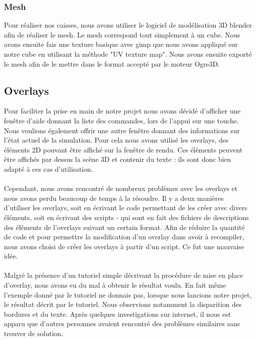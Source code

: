 \subsubsection{Mesh}
Pour réaliser nos caisses, nous avons utiliser le logiciel de modélisation 3D
blender afin de réaliser le mesh. Le mesh correspond tout simplement à un
cube. Nous avons ensuite fais une texture basique avec gimp que nous avons
appliqué sur notre cube en utilisant la méthode "UV texture map".
Nous avons ensuite exporté le mesh afin de le mettre dans le format
accepté par le moteur Ogre3D.


\subsection{Overlays}
Pour faciliter la prise en main de notre projet nous avons décidé d'afficher
une fenêtre d'aide donnant la liste des commandes, lors de l'appui sur une
touche. Nous voulions également offrir une autre fenêtre donnant des
informations sur l'état actuel de la simulation.
Pour cela nous avons utilisé les overlays, des éléments 2D pouvant être
affiché sur la fenêtre de rendu. Ces éléments peuvent être affichés par dessus
la scène 3D et contenir du texte : ils sont donc bien adapté à ces cas
d'utilisation.

\paragraph{}
Cependant, nous avons rencontré de nombreux problèmes avec les overlays et
nous avons perdu beaucoup de temps à la résoudre. Il y a deux manières
d'utiliser les overlays, soit en écrivant le code permettant de les créer avec
divers éléments, soit en écrivant des scripts - qui sont en fait des fichiers
de descriptions des éléments de l'overlays suivant un certain format.
Afin de réduire la quantité de code et pour permettre la modification d'un
overlay dans avoir à recompiler, nous avons choisi de créer les overlays à
partir d'un script. Ce fut une mauvaise idée.

\paragraph{}
Malgré la présence d'un tutoriel simple décrivant la procédure de mise en
place d'overlay, nous avons eu du mal à obtenir le résultat voulu. En fait
même l'exemple donné par le tutoriel ne donnais pas, lorsque nous lancions
notre projet, le résultat décrit par le tutoriel. Nous observions notamment la
disparition des bordures et du texte. Après quelques investigations sur
internet, il nous est apparu que d'autres personnes avaient rencontré des
problèmes similaires sans trouver de solution.

